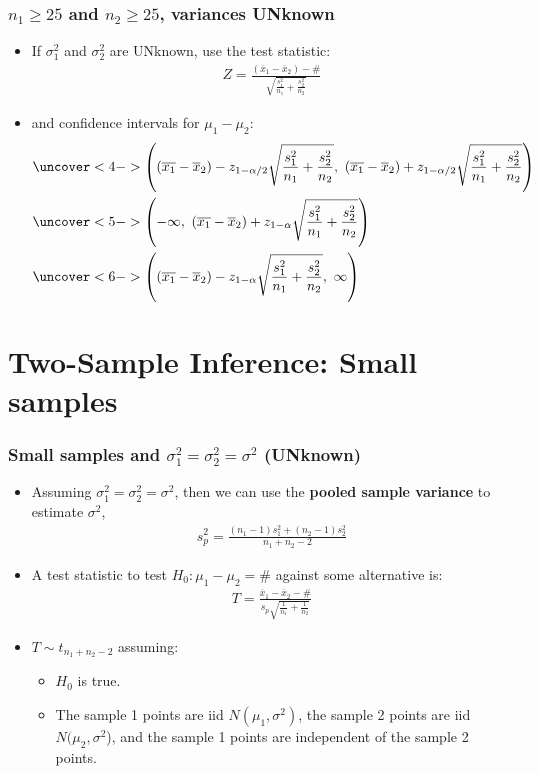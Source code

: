 \documentclass[handout]{beamer}\usepackage[]{graphicx}\usepackage[]{color}
\providecommand{\ov}[1]{\overline{#1}}
\numberwithin{equation}{section}
\begin{document}
\begin{frame}
\frametitle{$n_1 \ge 25$ and $n_2 \ge 25$, variances UNknown} \scriptsize
\begin{itemize}
\item If $\sigma^2_1$ and $\sigma_2^2$ are UNknown, use the test statistic:
\pause \begin{align*}
Z = \frac{(\ov{x}_1 - \ov{x}_2) - \#}{\sqrt{\frac{s^2_1}{n_1} + \frac{s^2_2}{n_2}}}
\end{align*}
\pause \item and confidence intervals for $\mu_1 - \mu_2$:
\begin{align*}
&\uncover<4->{\left ((\ov{x_1} - \ov{x}_2) - z_{1 - \alpha/2} \sqrt{\frac{s^2_1}{n_1} + \frac{s^2_2}{n_2}} , \ (\ov{x_1} - \ov{x}_2) + z_{1 - \alpha/2} \sqrt{\frac{s^2_1}{n_1} + \frac{s^2_2}{n_2}} \right )} \\
&\uncover<5->{\left (-\infty , \ (\ov{x_1} - \ov{x}_2) + z_{1 - \alpha} \sqrt{\frac{s^2_1}{n_1} + \frac{s^2_2}{n_2}} \right )} \\
&\uncover<6->{\left ((\ov{x_1} - \ov{x}_2) - z_{1 - \alpha} \sqrt{\frac{s^2_1}{n_1} + \frac{s^2_2}{n_2}}, \ \infty \right )} 
\end{align*}
\end{itemize}
\end{frame}



\section{Two-Sample Inference: Small samples}

\begin{frame}
\frametitle{Small samples and $\sigma^2_1 = \sigma^2_2 = \sigma^2$ (UNknown)}
\begin{itemize}
\item Assuming $\sigma^2_1 = \sigma^2_2 = \sigma^2$, then we can use the {\bf pooled sample variance} to estimate $\sigma^2$,
\pause \begin{align*}
s^2_p = \frac{(n_1 - 1) s_1^2 + (n_2 - 1) s_2^2}{n_1 + n_2 - 2}
\end{align*}
\pause \item A test statistic to test $H_0: \mu_1 - \mu_2 = \#$ against some alternative is:
\pause \begin{align*}
T = \frac{\ov{x}_1 - \ov{x}_2 - \#}{s_p \sqrt{\frac{1}{n_1} + \frac{1}{n_2}}}
\end{align*}
\pause \item $T \sim t_{n_1 + n_2 -2}$ assuming:
\begin{itemize}
\pause \item $H_0$ is true.
\pause \item The sample 1 points are iid $N(\mu_1, \sigma^2)$, the sample 2 points are iid $N(\mu_2, \sigma^2$), and the sample 1 points are independent of the sample 2 points.
\end{itemize}
\end{itemize}
\end{frame}
\end{document}
